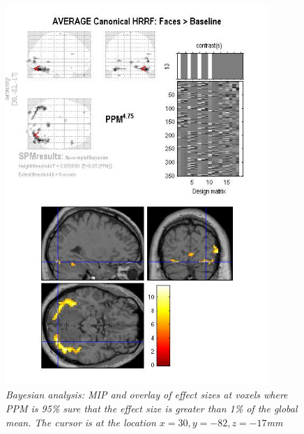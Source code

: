\begin{figure}
\begin{center}
\includegraphics[width=100mm]{faces/face_bayes}
\caption{\em Bayesian analysis: MIP and overlay of effect sizes at voxels where PPM is 95\% sure that the effect size is greater than 1\% of the global mean. The cursor is at the location $x=30,y=-82,z=-17$mm\label{face_bayes} }
\end{center}
\end{figure}
